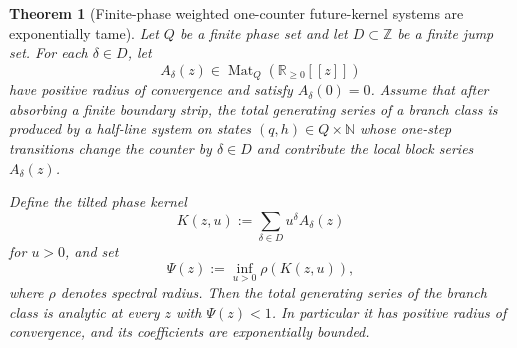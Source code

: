 \documentclass[11pt]{article}
\newtheorem{theorem}{Theorem}[section]
\theoremstyle{definition}
\newcommand{\N}{\mathbb{N}}
\newcommand{\Z}{\mathbb{Z}}
\newcommand{\R}{\mathbb{R}}
\newcommand{\1}{\mathbf{1}}
\begin{document}
\begin{theorem}[Finite-phase weighted one-counter future-kernel systems are exponentially tame]\label{thm:future-kernel-one-counter}
Let $Q$ be a finite phase set and let $D\subset \Z$ be a finite jump set.
For each $\delta\in D$, let
\[
A_\delta(z)\in \operatorname{Mat}_Q(\R_{\ge 0}[[z]])
\]
have positive radius of convergence and satisfy $A_\delta(0)=0$.
Assume that after absorbing a finite boundary strip, the total generating series of a branch class is produced by a half-line system on states $(q,h)\in Q\times \N$ whose one-step transitions change the counter by $\delta\in D$ and contribute the local block series $A_\delta(z)$.

Define the tilted phase kernel
\[
K(z,u):=\sum_{\delta\in D} u^\delta A_\delta(z)
\]
for $u>0$, and set
\[
\Psi(z):=\inf_{u>0}\rho(K(z,u)),
\]
where $\rho$ denotes spectral radius.
Then the total generating series of the branch class is analytic at every $z$ with $\Psi(z)<1$.
In particular it has positive radius of convergence, and its coefficients are exponentially bounded.
\end{theorem}
\end{document}
